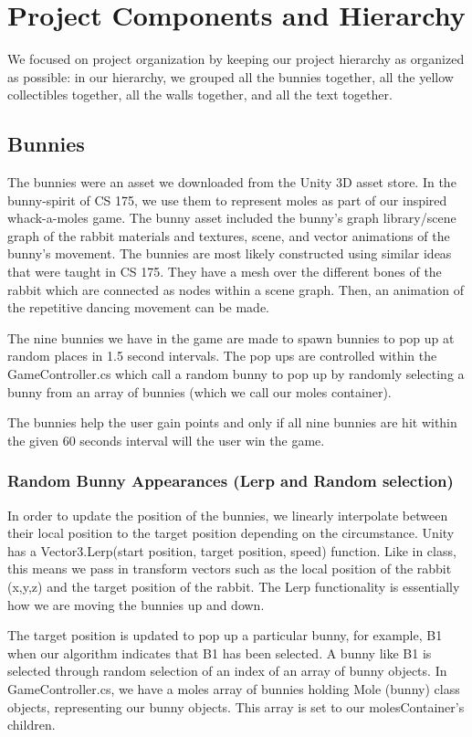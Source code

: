 \documentclass[12pt]{article}
\begin{document}
\section{Project Components and Hierarchy}
  We focused on project organization by keeping our project hierarchy as organized as possible: in our hierarchy, we grouped all the bunnies together, all the yellow collectibles together, all the walls together, and all the text together.

\subsection{Bunnies}
The bunnies were an asset we downloaded from the Unity 3D asset store. In the bunny-spirit of CS 175, we use them to represent moles as part of our inspired whack-a-moles game. The bunny asset included the bunny's graph library/scene graph of the rabbit materials and textures, scene, and  vector animations of the bunny's movement. The bunnies are most likely constructed using similar ideas that were taught in CS 175. They have a mesh over the different bones of the rabbit which are connected as nodes within a scene graph. Then, an animation of the repetitive dancing movement can be made. 

The nine bunnies we have in the game are made to spawn bunnies to pop up at random places in 1.5 second intervals. The pop ups are controlled within the GameController.cs which call a random bunny to pop up by randomly selecting a bunny from an array of bunnies (which we call our moles container).

The bunnies help the user gain points and only if all nine bunnies are hit within the given 60 seconds interval will the user win the game. 

\subsubsection{Random Bunny Appearances (Lerp and Random selection)}
In order to update the position of the bunnies, we linearly interpolate between their local position to the target position depending on the circumstance. Unity has a Vector3.Lerp(start position, target position, speed) function. Like in class, this means we pass in transform vectors such as the local position of the rabbit (x,y,z) and the target position of the rabbit. The Lerp functionality is essentially how we are moving the bunnies up and down. 

The target position is updated to pop up a particular bunny, for example, B1 when our algorithm indicates that B1 has been selected. A bunny like B1 is selected through random selection of an index of an array of bunny objects. In GameController.cs, we have a moles array of bunnies holding Mole (bunny) class objects, representing our bunny objects. This array is set to our molesContainer's children. 
\end{document}
